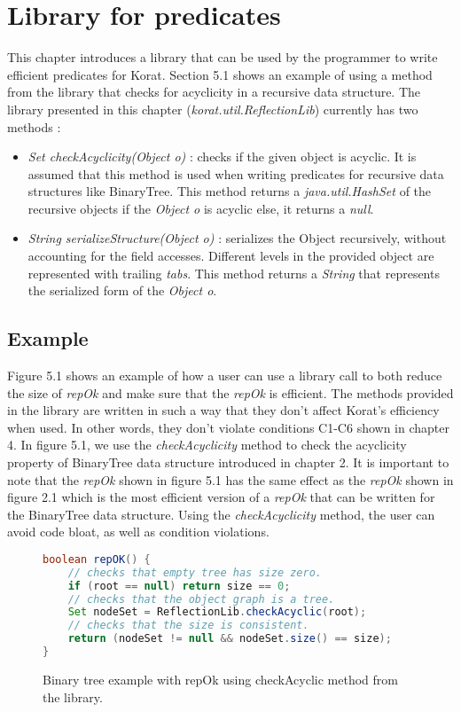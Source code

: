 \chapter{Library for predicates}
This chapter introduces a library that can be used by the programmer to write efficient predicates for Korat. Section 5.1 shows an example of using a method from the library that checks for acyclicity in a recursive data structure. The library presented in this chapter (\emph{korat.util.ReflectionLib}) currently has two methods :
\begin{itemize}
\item \emph{Set checkAcyclicity(Object o)} : checks if the given object is acyclic. It is assumed that this method is used when writing predicates for recursive data structures like BinaryTree. This method returns a \emph{java.util.HashSet} of the recursive objects if the \emph{Object o} is acyclic else, it returns a \emph{null}.
\item \emph{String serializeStructure(Object o)} : serializes the Object recursively, without accounting for the field accesses. Different levels in the provided object are represented with trailing \emph{tabs}. This method returns a \emph{String} that represents the serialized form of the \emph{Object o}.
\end{itemize}

\section{Example}
Figure 5.1 shows an example of how a user can use a library call to both reduce the size of \emph{repOk} and make sure that the \emph{repOk} is efficient. The methods provided in the library are written in such a way that they don't affect Korat's efficiency when used. In other words, they don't violate conditions C1-C6 shown in chapter 4. In figure 5.1, we use the \emph{checkAcyclicity} method to check the acyclicity property of BinaryTree data structure introduced in chapter 2. It is important to note that the \emph{repOk} shown in figure 5.1 has the same effect as the \emph{repOk} shown in figure 2.1 which is the most efficient version of a \emph{repOk} that can be written for the BinaryTree data structure. Using the \emph{checkAcyclicity} method, the user can avoid code bloat, as well as condition violations.

\begin{figure}
\centering
\begin{lstlisting}[language=Java]
boolean repOK() {
    // checks that empty tree has size zero.
    if (root == null) return size == 0;
    // checks that the object graph is a tree.
    Set nodeSet = ReflectionLib.checkAcyclic(root);
    // checks that the size is consistent.
    return (nodeSet != null && nodeSet.size() == size);
}
\end{lstlisting}
\caption{Binary tree example with repOk using checkAcyclic method from the library.}
\label{fig:btreeLibraryRepOk}
\end{figure}
